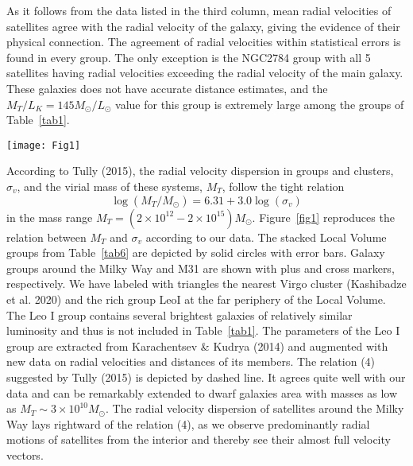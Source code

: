 \documentclass[proof]{WileyASNA-v1}
\begin{document}
As it follows from the data listed in the third column, mean radial velocities
of satellites agree with the radial velocity of the galaxy, giving the evidence
of their physical connection. The agreement of radial velocities within
statistical errors is found in every group. The only exception is the NGC2784
group with all 5 satellites having radial velocities exceeding the radial
velocity of the main galaxy. These galaxies does not have accurate distance
estimates, and the $M_T/L_K=145 M_{\odot}/L_{\odot}$ value for this group is
extremely large among the groups of Table~\ref{tab1}.

\begin{figure*}[t]
\centerline{\texttt{[image: Fig1]}}
\caption{Correlation between virial (orbital) mass and radial velocity
dispersion. The stacked groups in the Local Volume are presented as solid
circles, the Milky Way and M31 galaxies are depicted by plus and cross signs,
respectively. The dashed line corresponds to Tully (2015) relation for rich
groups and clusters.\label{fig1}}
\end{figure*}

According to Tully (2015), the radial velocity dispersion in groups and
clusters, $\sigma_v$, and the virial mass of these systems, $M_T$, follow the
tight relation
\begin{equation}
\log(M_T/M_{\odot})=6.31+3.0\log(\sigma_v) 
\end{equation}
in the mass range $M_T= (2\times10^{12} - 2\times10^{15})M_{\odot}$.
Figure~\ref{fig1} reproduces the relation between $M_T$ and $\sigma_v$ according
to our data. The stacked Local Volume groups from Table~\ref{tab6} are depicted
by solid circles with error bars. Galaxy groups around the Milky Way and M31 are
shown with plus and cross markers, respectively. We have labeled with triangles
the nearest Virgo cluster (Kashibadze et al. 2020) and the rich group LeoI at
the far periphery of the Local Volume. The Leo I group contains several
brightest galaxies of relatively similar luminosity and thus is not included in
Table~\ref{tab1}. The parameters of the Leo I group are extracted from
Karachentsev \& Kudrya (2014) and augmented with new data on radial velocities
and distances of its members. The relation (4) suggested by Tully (2015) is
depicted by dashed line. It agrees quite well with our data and can be
remarkably extended to dwarf galaxies area with masses as low as
$M_T\sim3\times10^{10}M_{\odot}$. The radial velocity dispersion of satellites
around the Milky Way lays rightward of the relation (4), as we observe
predominantly radial motions of satellites from the interior and thereby see
their almost full velocity vectors.
\end{document}
